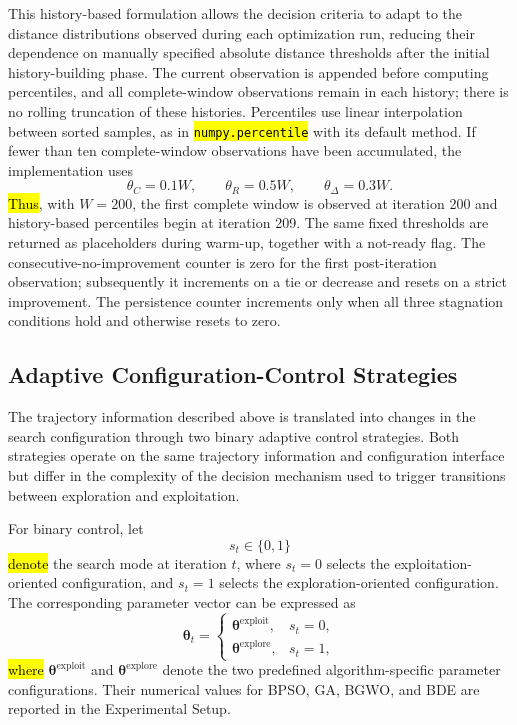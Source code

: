 \documentclass[mathematics,article,accept,moreauthors]{Definitions/mdpi}
\begin{document}
This history-based formulation allows the decision criteria to adapt to the
distance distributions observed during each optimization run, reducing
their dependence on manually specified absolute distance thresholds after
the initial history-building phase. The current observation is appended
before computing percentiles, and all complete-window observations remain
in each history; there is no rolling truncation of these histories.
Percentiles use linear interpolation between sorted samples, as in
\texttt{\hl{numpy.percentile}} %
 with its default method. If fewer than ten
complete-window observations have been accumulated, the implementation uses
\begin{equation}
\theta_C=0.1W,\qquad\theta_R=0.5W,\qquad\theta_\Delta=0.3W.
\label{eq:initial_thresholds}
\end{equation}
\hl{Thus}, with $W=200$, the first complete window is observed at iteration 200
and history-based percentiles begin at iteration 209. The same fixed
thresholds are returned as placeholders during warm-up, together with a
not-ready flag. The consecutive-no-improvement counter is zero for the
first post-iteration observation; subsequently it increments on a tie or
decrease and resets on a strict improvement. The persistence counter
increments only when all three stagnation conditions hold and otherwise
resets to zero.


\subsection{Adaptive Configuration-Control Strategies}
\label{sec:adaptation_strategies}

The trajectory information described above is translated into changes in
the search configuration through two binary adaptive control strategies.
Both strategies operate on the same trajectory information and configuration
interface but differ in the complexity of the decision mechanism used to
trigger transitions between exploration and exploitation.

For binary control, let
\begin{equation}
s_t \in \{0,1\}
\end{equation}
\hl{denote} the search mode at iteration $t$, where $s_t=0$ selects the
exploitation-oriented configuration, and $s_t=1$ selects the
exploration-oriented configuration. The corresponding parameter vector can
be expressed as
\begin{equation}
\boldsymbol{\theta}_t =
\begin{cases}
\boldsymbol{\theta}^{\mathrm{exploit}}, & s_t=0,\\
\boldsymbol{\theta}^{\mathrm{explore}}, & s_t=1,
\end{cases}
\label{eq:binary_config}
\end{equation}
\hl{where} $\boldsymbol{\theta}^{\mathrm{exploit}}$ and
$\boldsymbol{\theta}^{\mathrm{explore}}$ denote the two predefined
algorithm-specific parameter configurations. Their numerical values for
BPSO, GA, BGWO, and BDE are reported in the Experimental Setup.
\end{document}
